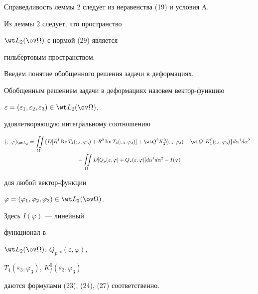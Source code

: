 Справедливость леммы 2 следует из неравенства (19) и условия A. 


 


Из леммы 2 следует, что пространство 


$\wt L_2(\ov\Omega)$ с нормой (29) является 


гильбертовым пространством. 





Введем понятие обобщенного решения задачи в деформациях.


 


\begin{defnnonum} 


Обобщенным решением задачи в деформациях назовем вектор-функцию 


$\varepsilon=(\varepsilon_1,\varepsilon_2,\varepsilon_3)\in 


\wt L_2(\ov\Omega)$, 


удовлетворяющую интегральному соотношению 


\begin{multline} 


(\varepsilon,\varphi)_{\wt L_2}=\intO\{D[R^1\re T_4 


(\varepsilon_3,\varphi_3)+R^2\im T_4(\varepsilon_3,\varphi_3)] 


+\wt Q^2K^0_2(\varepsilon_3,\varphi_3)- 


\wt Q^1K^0_1(\varepsilon_3,\varphi_3)\}d\alpha^1d\alpha^2- \\ 


-\intO D[Q_p(\varepsilon,\varphi)+ 


Q_*(\varepsilon,\varphi)]d\alpha^1d\alpha^2- I(\varphi) 


\end{multline} 


для любой вектор-функции 


$\varphi=(\varphi_1,\varphi_2,\varphi_3)\in\wt L_2(\ov\Omega)$. 


Здесь $I(\varphi)$ --- линейный 


функционал в 


$\wt L_2(\ov\Omega)$; $Q_{p,*}(\varepsilon,\varphi)$, 


$T_4(\varepsilon_3,\varphi_3)$, $K^0_j(\varepsilon_3,\varphi_3)$ 


даются формулами (23), (24), (27) соответственно. 


\end{defnnonum} 


